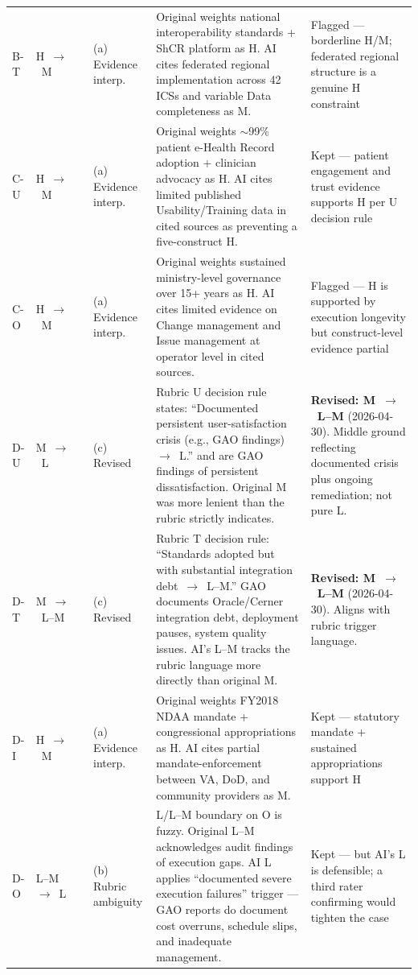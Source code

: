 \begin{longtable}{p{1.0cm} p{1.3cm} >{\centering\arraybackslash}p{0.4cm} p{1.5cm} p{7.5cm} p{2.5cm}}
B-T & H~$\rightarrow$~M & 1 & (a) Evidence interp. &
Original weights national interoperability standards + ShCR platform as H.
AI cites federated regional implementation across 42 ICSs and variable Data
completeness as M. &
Flagged --- borderline H/M; federated regional structure is a genuine H constraint \\

\rowcolor{rowgray}
C-U & H~$\rightarrow$~M & 1 & (a) Evidence interp. &
Original weights $\sim$99\% patient e-Health Record adoption + clinician advocacy as H.
AI cites limited published Usability/Training data in cited sources as preventing
a five-construct H. &
Kept --- patient engagement and trust evidence supports H per U decision rule \\

C-O & H~$\rightarrow$~M & 1 & (a) Evidence interp. &
Original weights sustained ministry-level governance over 15+ years as H.
AI cites limited evidence on Change management and Issue management at operator
level in cited sources. &
Flagged --- H is supported by execution longevity but construct-level evidence partial \\

\rowcolor{rowgray}
D-U & M~$\rightarrow$~L & 2 & (c) Revised &
Rubric U decision rule states: ``Documented persistent user-satisfaction crisis
(e.g., GAO findings)~$\rightarrow$~L.'' \cite{gao2025vaehr} and \cite{gao2024dodehr}
are GAO findings of persistent dissatisfaction. Original M was more lenient than the
rubric strictly indicates. &
\textbf{Revised: M~$\rightarrow$~L--M} (2026-04-30). Middle ground reflecting
documented crisis plus ongoing remediation; not pure L. \\

D-T & M~$\rightarrow$~L--M & 1 & (c) Revised &
Rubric T decision rule: ``Standards adopted but with substantial integration
debt~$\rightarrow$~L--M.'' GAO documents Oracle/Cerner integration debt, deployment
pauses, system quality issues. AI's L--M tracks the rubric language more directly
than original M. &
\textbf{Revised: M~$\rightarrow$~L--M} (2026-04-30). Aligns with rubric trigger language. \\

\rowcolor{rowgray}
D-I & H~$\rightarrow$~M & 1 & (a) Evidence interp. &
Original weights FY2018 NDAA mandate + congressional appropriations as H.
AI cites partial mandate-enforcement between VA, DoD, and community providers as M. &
Kept --- statutory mandate + sustained appropriations support H \\

D-O & L--M~$\rightarrow$~L & 1 & (b) Rubric ambiguity &
L/L--M boundary on O is fuzzy. Original L--M acknowledges audit findings of
execution gaps. AI L applies ``documented severe execution failures'' trigger ---
GAO reports do document cost overruns, schedule slips, and inadequate management. &
Kept --- but AI's L is defensible; a third rater confirming would tighten the case \\

\end{longtable}

